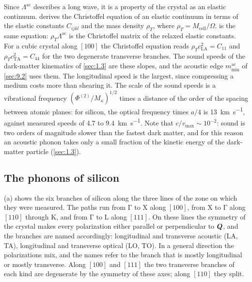 Since $\Lambda^{\mathrm{ac}}$ describes a long wave, it is a property of the crystal as an elastic continuum.  derives the Christoffel equation of an elastic continuum in terms of the elastic constants $C_{ijkl}$ and the mass density $\rho_T$, where $\rho_T = M_{\mathrm{cell}}/\Omega$.  is the same equation: $\rho_T\Lambda^{\mathrm{ac}}$ is the Christoffel matrix of the relaxed elastic constants. For a cubic crystal along $[100]$ the Christoffel equation reads $\rho_Tc_{\mathrm{LA}}^2 = C_{11}$ and $\rho_Tc_{\mathrm{TA}}^2 = C_{44}$ for the two degenerate transverse branches. The sound speeds of the dark-matter kinematics of \cref{sec:1.3} are these slopes, and the acoustic edge $m^{\mathrm{ac}}_{\mathrm{min}}$ of \cref{sec:9.2} uses them. The longitudinal speed is the largest, since compressing a medium costs more than shearing it. The scale of the sound speeds is a vibrational frequency $(\Phi^{(2)}/M_\kappa)^{1/2}$ times a distance of the order of the spacing between atomic planes: for silicon, the optical frequency times $a/4$ is \SI{13}{km.s^{-1}}, against measured speeds of 4.7 to \SI{9.4}{km.s^{-1}}. Note that $c/v_{\mathrm{max}} \sim 10^{-2}$: sound is two orders of magnitude slower than the fastest dark matter, and for this reason an acoustic phonon takes only a small fraction of the kinetic energy of the dark-matter particle (\cref{sec:1.3}).

\subsection{The phonons of silicon}

(a) shows the six branches of silicon along the three lines of the zone on which they were measured. The paths run from $\mathrm{\Gamma}$ to X along $[100]$, from X to $\mathrm{\Gamma}$ along $[110]$ through K, and from $\mathrm{\Gamma}$ to L along $[111]$. On these lines the symmetry of the crystal makes every polarization either parallel or perpendicular to $\bm{Q}$, and the branches are named accordingly: longitudinal and transverse acoustic (LA, TA), longitudinal and transverse optical (LO, TO). In a general direction the polarizations mix, and the names refer to the branch that is mostly longitudinal or mostly transverse. Along $[100]$ and $[111]$ the two transverse branches of each kind are degenerate by the symmetry of these axes; along $[110]$ they split.

